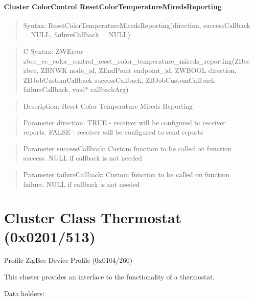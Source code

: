 \paragraph{Cluster ColorControl ResetColorTemperatureMiredsReporting}
\begin{quote}Syntax: ResetColorTemperatureMiredsReporting(direction, successCallback = NULL, failureCallback = NULL)\end{quote}
\begin{quote}C Syntax: ZWError zbee\_cc\_color\_control\_reset\_color\_temperature\_mireds\_reporting(ZBee zbee, ZBNWK node\_id, ZEndPoint endpoint\_id, ZWBOOL direction, ZBJobCustomCallback successCallback, ZBJobCustomCallback failureCallback, void* callbackArg)\end{quote}
\begin{quote}Description: Reset Color Temperature Mireds Reporting\end{quote}
\begin{quote}Parameter direction: TRUE  - receiver will be configured to receiver reports. FALSE - receiver will be configured to send reports\end{quote}
\begin{quote}Parameter successCallback: Custom function to be called on function success. NULL if callback is not needed\end{quote}
\begin{quote}Parameter failureCallback: Custom function to be called on function failure. NULL if callback is not needed\end{quote}



\section{Cluster Class Thermostat (0x0201/513)}

Profile ZigBee Device Profile (0x0104/260)

This cluster provides an interface to the functionality of a thermostat.
\newline

\noindent
Data holders:

